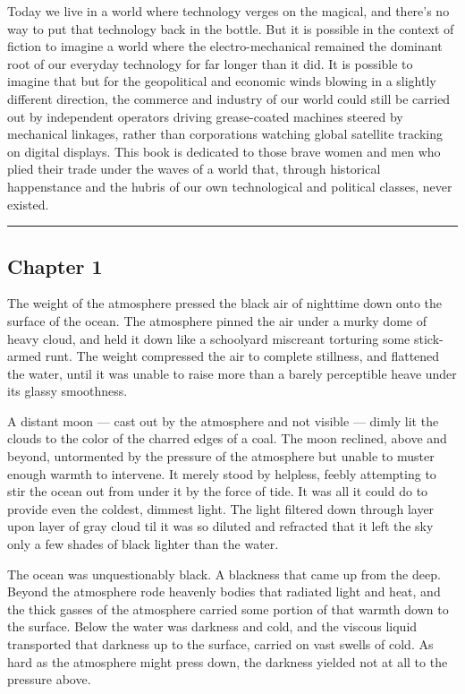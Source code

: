 \documentclass[]{article}
\begin{document}
\begin{multicols}{2}
Today we live in a world where technology verges on the magical, and
there's no way to put that technology back in the bottle. But it is
possible in the context of fiction to imagine a world where the
electro-mechanical remained the dominant root of our everyday technology
for far longer than it did. It is possible to imagine that but for the
geopolitical and economic winds blowing in a slightly different
direction, the commerce and industry of our world could still be carried
out by independent operators driving grease-coated machines steered by
mechanical linkages, rather than corporations watching global satellite
tracking on digital displays. This book is dedicated to those brave
women and men who plied their trade under the waves of a world that,
through historical happenstance and the hubris of our own technological
and political classes, never existed.

\begin{center}\rule{0.5\linewidth}{\linethickness}\end{center}

\hypertarget{chapter-1}{%
\subsection{Chapter 1}\label{chapter-1}}

The weight of the atmosphere pressed the black air of nighttime down
onto the surface of the ocean. The atmosphere pinned the air under a
murky dome of heavy cloud, and held it down like a schoolyard miscreant
torturing some stick-armed runt. The weight compressed the air to
complete stillness, and flattened the water, until it was unable to
raise more than a barely perceptible heave under its glassy smoothness.

A distant moon --- cast out by the atmosphere and not visible --- dimly
lit the clouds to the color of the charred edges of a coal. The moon
reclined, above and beyond, untormented by the pressure of the
atmosphere but unable to muster enough warmth to intervene. It merely
stood by helpless, feebly attempting to stir the ocean out from under it
by the force of tide. It was all it could do to provide even the
coldest, dimmest light. The light filtered down through layer upon layer
of gray cloud til it was so diluted and refracted that it left the sky
only a few shades of black lighter than the water.

The ocean was unquestionably black. A blackness that came up from the
deep. Beyond the atmosphere rode heavenly bodies that radiated light and
heat, and the thick gasses of the atmosphere carried some portion of
that warmth down to the surface. Below the water was darkness and cold,
and the viscous liquid transported that darkness up to the surface,
carried on vast swells of cold. As hard as the atmosphere might press
down, the darkness yielded not at all to the pressure above.


\end{multicols}
\end{document}
